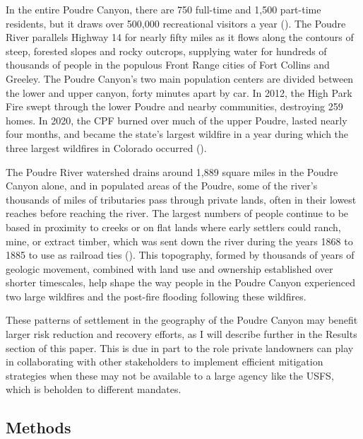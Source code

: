 \documentclass[
]{article}
\begin{document}
In the entire Poudre Canyon, there are 750 full-time and 1,500 part-time residents, but it draws over 500,000 recreational visitors a year (). The Poudre River parallels Highway 14 for nearly fifty miles as it flows along the contours of steep, forested slopes and rocky outcrops, supplying water for hundreds of thousands of people in the populous Front Range cities of Fort Collins and Greeley. The Poudre Canyon's two main population centers are divided between the lower and upper canyon, forty minutes apart by car. In 2012, the High Park Fire swept through the lower Poudre and nearby communities, destroying 259 homes. In 2020, the CPF burned over much of the upper Poudre, lasted nearly four months, and became the state's largest wildfire in a year during which the three largest wildfires in Colorado occurred ().

The Poudre River watershed drains around 1,889 square miles in the Poudre Canyon alone, and in populated areas of the Poudre, some of the river's thousands of miles of tributaries pass through private lands, often in their lowest reaches before reaching the river. The largest numbers of people continue to be based in proximity to creeks or on flat lands where early settlers could ranch, mine, or extract timber, which was sent down the river during the years 1868 to 1885 to use as railroad ties (). This topography, formed by thousands of years of geologic movement, combined with land use and ownership established over shorter timescales, help shape the way people in the Poudre Canyon experienced two large wildfires and the post-fire flooding following these wildfires.

These patterns of settlement in the geography of the Poudre Canyon may benefit larger risk reduction and recovery efforts, as I will describe further in the Results section of this paper. This is due in part to the role private landowners can play in collaborating with other stakeholders to implement efficient mitigation strategies when these may not be available to a large agency like the USFS, which is beholden to different mandates.

\subsection{Methods}\label{methods-1}
\end{document}
